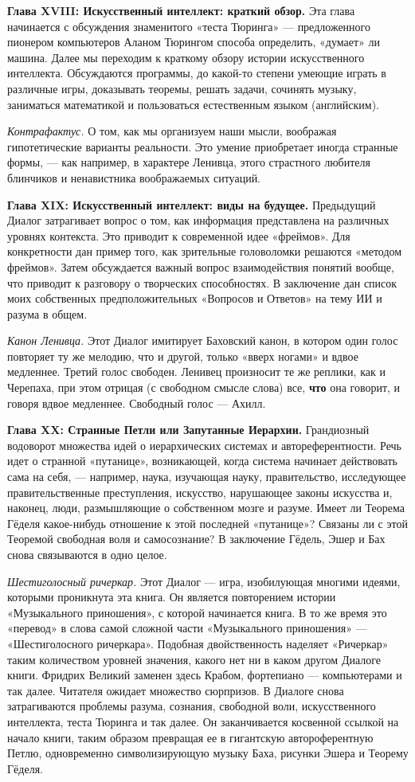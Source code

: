 \textbf{Глава XVIII: Искусственный интеллект: краткий обзор.} Эта глава начинается с обсуждения знаменитого «теста Тюринга» --- предложенного пионером компьютеров Аланом Тюрингом способа определить, «думает» ли машина. Далее мы переходим к краткому обзору истории искусственного интеллекта. Обсуждаются программы, до какой-то степени умеющие играть в различные игры, доказывать теоремы, решать задачи, сочинять музыку, заниматься математикой и пользоваться естественным языком (английским).

\emph{Контрафактус.} О том, как мы организуем наши мысли, воображая гипотетические варианты реальности. Это умение приобретает иногда странные формы, --- как например, в характере Ленивца, этого страстного любителя блинчиков и ненавистника воображаемых ситуаций.

\textbf{Глава XIX: Искусственный интеллект: виды на будущее.} Предыдущий Диалог затрагивает вопрос о том, как информация представлена на различных уровнях контекста. Это приводит к современной идее «фреймов». Для конкретности дан пример того, как зрительные головоломки решаются «методом фреймов». Затем обсуждается важный вопрос взаимодействия понятий вообще, что приводит к разговору о творческих способностях. В заключение дан список моих собственных предположительных «Вопросов и Ответов» на тему ИИ и разума в общем.

\emph{Канон Ленивца.} Этот Диалог имитирует Баховский канон, в котором один голос повторяет ту же мелодию, что и другой, только «вверх ногами» и вдвое медленнее. Третий голос свободен. Ленивец произносит те же реплики, как и Черепаха, при этом отрицая (с свободном смысле слова) все, \textbf{что} она говорит, и говоря вдвое медленнее. Свободный голос --- Ахилл.

\textbf{Глава XX: Странные Петли или Запутанные Иерархии.} Грандиозный водоворот множества идей о иерархических системах и автореферентности. Речь идет о странной «путанице», возникающей, когда система начинает действовать сама на себя, --- например, наука, изучающая науку, правительство, исследующее правительственные преступления, искусство, нарушающее законы искусства и, наконец, люди, размышляющие о собственном мозге и разуме. Имеет ли Теорема Гёделя какое-нибудь отношение к этой последней «путанице»? Связаны ли с этой Теоремой свободная воля и самосознание? В заключение Гёдель, Эшер и Бах снова связываются в одно целое.

\emph{Шестиголосный ричеркар.} Этот Диалог --- игра, изобилующая многими идеями, которыми проникнута эта книга. Он является повторением истории «Музыкального приношения», с которой начинается книга. В то же время это «перевод» в слова самой сложной части «Музыкального приношения» --- «Шестиголосного ричеркара». Подобная двойственность наделяет «Ричеркар» таким количеством уровней значения, какого нет ни в каком другом Диалоге книги. Фридрих Великий заменен здесь Крабом, фортепиано --- компьютерами и так далее. Читателя ожидает множество сюрпризов. В Диалоге снова затрагиваются проблемы разума, сознания, свободной воли, искусственного интеллекта, теста Тюринга и так далее. Он заканчивается косвенной ссылкой на начало книги, таким образом превращая ее в гигантскую автороферентную Петлю, одновременно символизирующую музыку Баха, рисунки Эшера и Теорему Гёделя.

